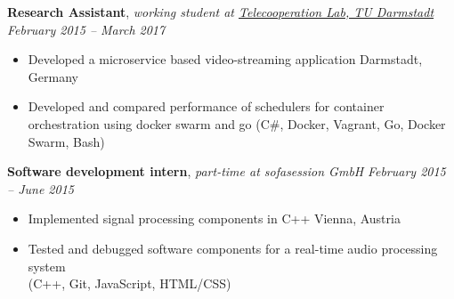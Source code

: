 \documentclass[9pt]{extarticle}
\begin{document}
\noindent
{\bf Research Assistant}, \textit{working student at \href{https://www.informatik.tu-darmstadt.de/telekooperation/telecooperation_group/index.en.jsp}{Telecooperation Lab, TU Darmstadt}}  \hfill \textit{February 2015 -- March 2017}
\begin{itemize}
\setlength\itemsep{0.05em}
    \item Developed a microservice based video-streaming application \hfill Darmstadt, Germany
    \item Developed and compared performance of schedulers for container orchestration using docker swarm and go
    (C\#, Docker, Vagrant, Go, Docker Swarm, Bash) \\
\end{itemize}


\noindent
{\bf Software development intern}, \textit{part-time at sofasession GmbH}  \hfill \textit{February 2015 -- June 2015}
\begin{itemize}
    \setlength\itemsep{0.05em}
    \item Implemented signal processing components in C++ \hfill Vienna, Austria
    \item Tested and debugged software components for a real-time audio processing system \\
    (C++, Git, JavaScript, HTML/CSS) \\
\end{itemize}
\end{document}
